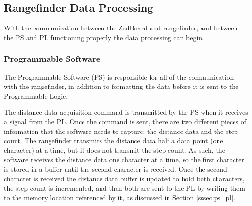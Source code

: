 \subsection{Rangefinder Data Processing}
With the communication between the ZedBoard and rangefinder, and between the PS and PL functioning properly the data processing can begin.

\subsubsection{Programmable Software}
The Programmable Software (PS) is responsible for all of the communication with the rangefinder, in addition to formatting the data before it is sent to the Programmable Logic.
\par
The distance data acquisition command is transmitted by the PS when it receives a signal from the PL. Once the command is sent, there are two different pieces of information that the software needs to capture: the distance data and the step count. The rangefinder transmits the distance data half a data point (one character) at a time, but it does not transmit the step count. As such, the software receives the distance data one character at a time, so the first character is stored in a buffer until the second character is received. Once the second character is received the distance data buffer is updated to hold both characters, the step count is incremented, and then both are sent to the PL by writing them to the memory location referenced by it, as discussed in Section \ref{sssec:ps_pl}.

